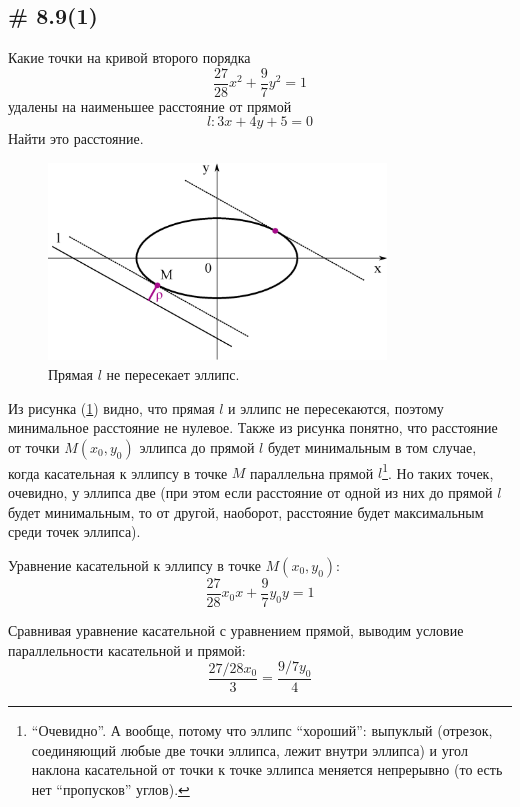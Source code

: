 \documentclass[a4paper,12pt]{article}
\begin{document}
  
  \subsection{\# 8.9(1)}
  
  Какие точки на кривой второго порядка
  \[
    \frac{27}{28} x^2 + \frac{9}{7} y^2 = 1
  \]
  удалены на наименьшее расстояние от прямой
  \[
    l\colon 3x + 4y + 5 = 0
  \]
  Найти это расстояние.
  
  \begin{solution}
    \begin{figure}[h]
      \centering

      \includegraphics[width=0.8\textwidth]{ellipse-8-9}
    
      \caption{Прямая $l$ не пересекает эллипс.}
      \label{fig:ellipse-8-9}
    \end{figure}
    
    Из рисунка (\ref{fig:ellipse-8-9}) видно, что прямая $l$ и эллипс не пересекаются, поэтому минимальное расстояние не нулевое.
    Также из рисунка понятно, что расстояние от точки $M(x_0, y_0)$ эллипса до прямой $l$ будет минимальным в том случае, когда касательная к эллипсу в точке $M$ параллельна прямой $l$\footnote{``Очевидно''. А вообще, потому что эллипс ``хороший'': выпуклый (отрезок, соединяющий любые две точки эллипса, лежит внутри эллипса) и угол наклона касательной от точки к точке эллипса меняется непрерывно (то есть нет ``пропусков'' углов).}.
    Но таких точек, очевидно, у эллипса две (при этом если расстояние от одной из них до прямой $l$ будет минимальным, то от другой, наоборот, расстояние будет максимальным среди точек эллипса).
    
    Уравнение касательной к эллипсу в точке $M(x_0, y_0)$:
    \[
      \frac{27}{28} x_0 x + \frac{9}{7} y_0 y = 1
    \]
    
    Сравнивая уравнение касательной с уравнением прямой, выводим условие параллельности касательной и прямой:
    \[
      \frac{27/28 x_0}{3} = \frac{9/7 y_0}{4}
    \]
    

\end{solution}
\end{document}

